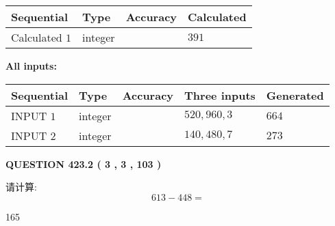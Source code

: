 \documentclass{ctexart}
\begin{document}
   
\noindent{}
   
   
  
  
\noindent\begin{tabular}{|l|l|l|l|}
\hline
 Sequential & Type & Accuracy & Calculated \\ 
\hline
 
 
  Calculated $  1 $ & integer &  & 
  $ 391 $ 
 \\  \hline  
 \end{tabular}
   
   
   
   
\noindent\vspace{0.1in}\hspace{-0.08in} {\textbf{\Large{All inputs: }}}
   
   
  
  
\noindent\begin{tabular}{|l|l|l|l|l|}
\hline
 Sequential & Type & Accuracy & Three inputs & Generated \\ 
\hline
 
 
  INPUT $  1 $ & integer &  & $
 520
 , 
 960
 , 
 3
 $ & $ 664 $ 
 \\  \hline  
 
 
  INPUT $  2 $ & integer &  & $
 140
 , 
 480
 , 
 7
 $ & $ 273 $ 
 \\  \hline  
 \end{tabular}
   
   
  
\vspace{0.2in}
  
{\textbf{\Large{QUESTION
423.2 
 ( 3 , 3 , 103 )
}}}
  
  
 
请计算:
\begin{equation}
613 -   %
448 = \nonumber
\end{equation}
 
 
 
\noindent{}
 
 

165
 
 
\noindent{}
 
 

 
 
 
\noindent{}
 
\end{document}
